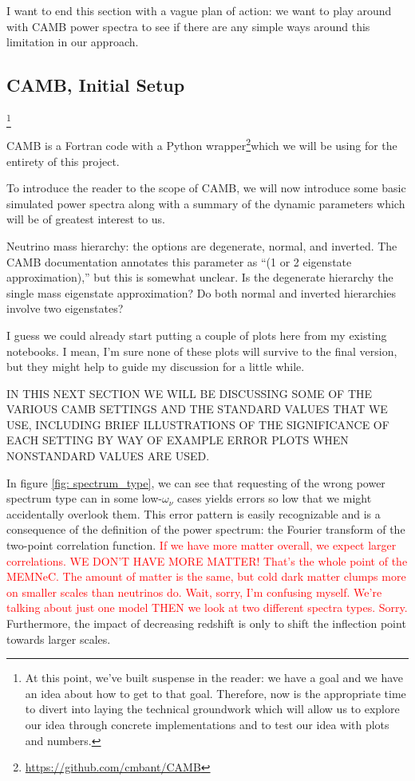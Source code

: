 \documentclass[11pt]{article}
\begin{document}
I want to end this section with a vague plan of action: we want to play around with CAMB power spectra to see if there are any simple ways around this limitation in our approach.

\begin{centering}
\section{CAMB, Initial Setup}
\end{centering}
\footnote{
    At this point, we've built suspense in the reader: we have a goal and
    we have an idea about how to get to that goal. Therefore, now is the
    appropriate time to divert into laying the technical groundwork which
    will allow us to explore our idea through concrete implementations and
    to test our idea with plots and numbers.
}

CAMB is a Fortran code with a Python wrapper\footnote{
\url{https://github.com/cmbant/CAMB}
}which we will be using for the
entirety of this project.

To introduce the reader to the scope of CAMB, we will now introduce
some basic simulated power spectra along with a summary of the dynamic
parameters which will be of greatest interest to us.

Neutrino mass hierarchy: the options are degenerate, normal, and inverted.
The CAMB documentation annotates this parameter as ``(1 or 2 eigenstate
approximation),'' but this is somewhat unclear. Is the degenerate
hierarchy the single mass eigenstate approximation? Do both normal
and inverted hierarchies involve two eigenstates?

I guess we could already start putting a couple of plots here from my existing
notebooks. I mean, I'm sure none of these plots will survive to the final
version, but they might help to guide my discussion for a little while.

IN THIS NEXT SECTION WE WILL BE DISCUSSING SOME OF THE VARIOUS CAMB SETTINGS
AND THE STANDARD VALUES THAT WE USE, INCLUDING BRIEF ILLUSTRATIONS OF THE
SIGNIFICANCE OF EACH SETTING BY WAY OF EXAMPLE ERROR PLOTS WHEN NONSTANDARD
VALUES ARE USED.

In figure \ref{fig: spectrum_type}, we can see that requesting of the wrong
power spectrum type can in some low-$\omega_\nu$ cases yields errors so low
that we might accidentally overlook them. This error pattern is easily
recognizable and is a consequence of the definition of the power spectrum: the
Fourier transform  of the two-point correlation function.
\textcolor{red}{If we
have more matter overall, we expect larger correlations.
WE DON'T HAVE MORE MATTER! That's the whole point of the MEMNeC. The amount of
matter is the same, but cold dark matter clumps more on smaller scales than
neutrinos do. Wait, sorry, I'm confusing myself. We're talking about just one
model THEN we look at two different spectra types. Sorry.
}
Furthermore, the impact of decreasing redshift is only to shift the inflection
point towards larger scales.
\end{document}
